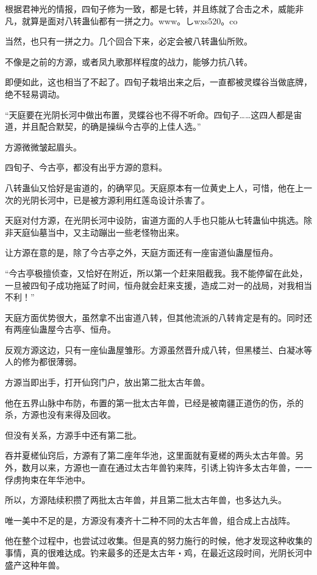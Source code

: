 
\begin{this_body}

根据君神光的情报，四旬子修为一致，都是七转，并且练就了合击之术，威能非凡，就算是面对八转蛊仙都有一拼之力。www。しwxs520。co

当然，也只有一拼之力。几个回合下来，必定会被八转蛊仙所败。

不像是之前的方源，或者凤九歌那样程度的战力，能够力抗八转。

即便如此，这也相当了不起了。四旬子栽培出来之后，一直都被灵蝶谷当做底牌，绝不轻易调动。

“天庭要在光阴长河中做出布置，灵蝶谷也不得不听命。四旬子……这四人都是宙道，并且配合默契，的确是操纵今古亭的上佳人选。”

方源微微皱起眉头。

四旬子、今古亭，都没有出乎方源的意料。

八转蛊仙又恰好是宙道的，的确罕见。天庭原本有一位黄史上人，可惜，他在上一次的光阴长河中，已是被方源利用红莲岛设计杀害了。

天庭对付方源，在光阴长河中设防，宙道方面的人手也只能从七转蛊仙中挑选。除非天庭仙墓当中，又主动蹦出一些老怪物出来。

让方源在意的是，除了今古亭之外，天庭方面还有一座宙道仙蛊屋恒舟。

“今古亭极擅侦查，又恰好在附近，所以第一个赶来阻截我。我不能停留在此处，一旦被四旬子成功拖延了时间，恒舟就会赶来支援，造成二对一的战局，对我相当不利！”

天庭方面优势很大，虽然拿不出宙道八转，但其他流派的八转肯定是有的。同时还有两座仙蛊屋今古亭、恒舟。

反观方源这边，只有一座仙蛊屋雏形。方源虽然晋升成八转，但黑楼兰、白凝冰等人的修为都很薄弱。

方源当即出手，打开仙窍门户，放出第二批太古年兽。

他在五界山脉中布防，布置的第一批太古年兽，已经是被南疆正道伤的伤，杀的杀，方源也没有来得及回收。

但没有关系，方源手中还有第二批。

吞并夏槎仙窍后，方源有了第二座年华池，这里面就有夏槎的两头太古年兽。另外，数月以来，方源也一直在通过太古年兽钓来阵，引诱上钩许多太古年兽，一一俘虏拘束在年华池中。

所以，方源陆续积攒了两批太古年兽，并且第二批太古年兽，也多达九头。

唯一美中不足的是，方源没有凑齐十二种不同的太古年兽，组合成上古战阵。

他在整个过程中，也尝试过收集。但是真的努力施行的时候，他才发现这种收集的事情，真的很难达成。钓来最多的还是太古年・鸡，在最近这段时间，光阴长河中盛产这种年兽。


\end{this_body}
